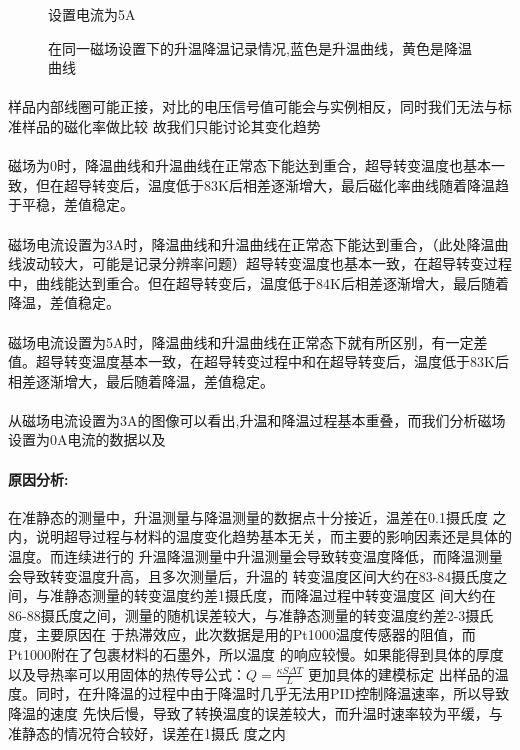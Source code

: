 \documentclass{ctexart}
\theoremstyle{ansstyle}
\begin{document}
\begin{figure}[H]
\begin{minipage}[t]{0.6\linewidth}
			\caption{设置电流为5A}
		\end{minipage}
	\caption{在同一磁场设置下的升温降温记录情况,蓝色是升温曲线，黄色是降温曲线}
	
\end{figure}
\paragraph{}样品内部线圈可能正接，对比的电压信号值可能会与实例相反，同时我们无法与标准样品的磁化率做比较
故我们只能讨论其变化趋势\\
\paragraph{}磁场为0时，降温曲线和升温曲线在正常态下能达到重合，超导转变温度也基本一致，但在超导转变后，温度低于83K后相差逐渐增大，最后磁化率曲线随着降温趋于平稳，差值稳定。\\
\paragraph{}磁场电流设置为3A时，降温曲线和升温曲线在正常态下能达到重合，（此处降温曲线波动较大，可能是记录分辨率问题）超导转变温度也基本一致，在超导转变过程中，曲线能达到重合。但在超导转变后，温度低于84K后相差逐渐增大，最后随着降温，差值稳定。\\
\paragraph{}磁场电流设置为5A时，降温曲线和升温曲线在正常态下就有所区别，有一定差值。超导转变温度基本一致，在超导转变过程中和在超导转变后，温度低于83K后相差逐渐增大，最后随着降温，差值稳定。
\paragraph{}
从磁场电流设置为3A的图像可以看出,升温和降温过程基本重叠，而我们分析磁场设置为0A电流的数据以及
\paragraph[short]{原因分析:}   
在准静态的测量中，升温测量与降温测量的数据点十分接近，温差在0.1摄氏度
之内，说明超导过程与材料的温度变化趋势基本无关，而主要的影响因素还是具体的温度。而连续进行的
升温降温测量中升温测量会导致转变温度降低，而降温测量会导致转变温度升高，且多次测量后，升温的
转变温度区间大约在83-84摄氏度之间，与准静态测量的转变温度约差1摄氏度，而降温过程中转变温度区
间大约在86-88摄氏度之间，测量的随机误差较大，与准静态测量的转变温度约差2-3摄氏度，主要原因在
于热滞效应，此次数据是用的Pt1000温度传感器的阻值，而Pt1000附在了包裹材料的石墨外，所以温度
的响应较慢。如果能得到具体的厚度以及导热率可以用固体的热传导公式：$Q =\frac{\kappa S \Delta T}{L} $ 更加具体的建模标定
出样品的温度。同时，在升降温的过程中由于降温时几乎无法用PID控制降温速率，所以导致降温的速度
先快后慢，导致了转换温度的误差较大，而升温时速率较为平缓，与准静态的情况符合较好，误差在1摄氏
度之内
\end{document}
